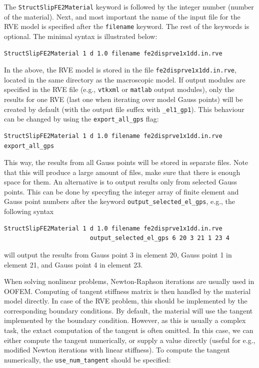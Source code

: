 \documentclass[11pt]{article}
\newcommand{\param}[1]{\texttt{#1}}
\begin{document}
\noindent The \param{StructSlipFE2Material} keyword is followed by the integer number (number of the material). 
Next, and most important the name of the input file for the RVE model is specified after the \param{filename} keyword. The rest of the keywords is optional.  
The minimal syntax is illustrated below:

\begin{lstlisting}[style=oofem, language=oofeminput]
StructSlipFE2Material 1 d 1.0 filename fe2disprve1x1dd.in.rve 
\end{lstlisting}

\noindent In the above, the RVE model is stored in the file \texttt{fe2disprve1x1dd.in.rve}, located in the same directory as the macroscopic model. 
If output modules are specified in the RVE file (e.g., \texttt{vtkxml} or \texttt{matlab} output modules), only the results for one RVE (last one when iterating over model Gauss points) will be created by default (with the output file suffex with \texttt{\_el1\_gp1}).
This behaviour can be changed by using the \param{export\_all\_gps} flag:

\begin{lstlisting}[style=oofem, language=oofeminput]
StructSlipFE2Material 1 d 1.0 filename fe2disprve1x1dd.in.rve export_all_gps
\end{lstlisting}

\noindent This way, the results from all Gauss points will be stored in separate files.
Note that this will produce a large amount of files, make sure that there is enough space for them.
An alternative is to output results only from selected Gauss points.
This can be done by specyfing the integer array of finite element and Gauss point numbers after the keyword \param{output\_selected\_el\_gps}, e.g., the following syntax

\begin{lstlisting}[style=oofem, language=oofeminput]
StructSlipFE2Material 1 d 1.0 filename fe2disprve1x1dd.in.rve 
                        output_selected_el_gps 6 20 3 21 1 23 4
\end{lstlisting}
will output the results from Gauss point 3 in element 20, Gauss point 1 in element 21, and Gauss point 4 in element 23.

When solving nonlinear problems, Newton-Raphson iterations are usually used in OOFEM. Computing of tangent stiffness matrix is then handled by the material model directly. In case of the RVE problem, this should be implemented by the corresponding boundary conditions. By default, the material will use the tangent implemented by the boundary condition. 
However, as this is usually a complex task, the extact computation of the tangent is often omitted. 
In this case, we can either compute the tangent numerically, or supply a value directly (useful for e.g., modified Newton iterations with linear stiffness).
To compute the tangent numerically, the \param{use\_num\_tangent} should be specified:
\end{document}
